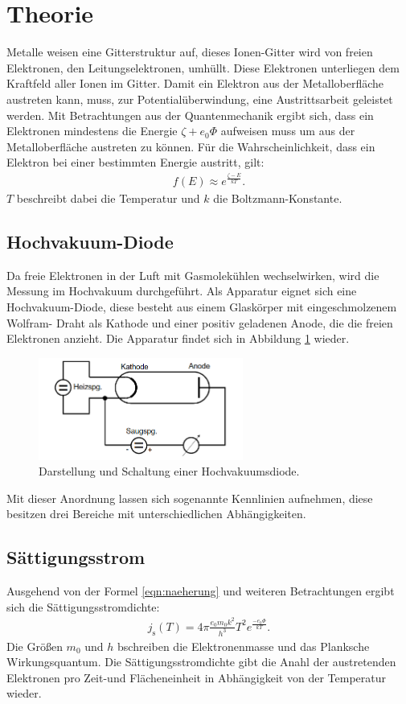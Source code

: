 \section{Theorie}
\label{sec:Theorie}
Metalle weisen eine Gitterstruktur auf, dieses Ionen-Gitter wird von freien Elektronen, den Leitungselektronen,
umhüllt. Diese Elektronen unterliegen dem Kraftfeld aller Ionen im Gitter.
Damit ein Elektron aus der Metalloberfläche austreten kann, muss, zur Potentialüberwindung, eine
Austrittsarbeit geleistet werden. Mit Betrachtungen aus der Quantenmechanik ergibt sich, dass
ein Elektronen mindestens die Energie $\zeta+e_\mathrm{0}\Phi$ aufweisen muss um aus der Metalloberfläche
austreten zu können. Für die Wahrscheinlichkeit, dass ein Elektron bei einer bestimmten Energie austritt, gilt:
\begin{align}
f(E)\approx e^{\frac{\zeta-E}{kT}}\label{eqn:naeherung}.
\end{align}
$T$ beschreibt dabei die Temperatur und $k$ die Boltzmann-Konstante.

\subsection{Hochvakuum-Diode}
Da freie Elektronen in der Luft mit Gasmolekühlen wechselwirken, wird die Messung im Hochvakuum durchgeführt.
Als Apparatur eignet sich eine Hochvakuum-Diode, diese besteht aus einem Glaskörper mit eingeschmolzenem Wolfram-
Draht als Kathode und einer positiv geladenen Anode, die die freien Elektronen anzieht.
Die Apparatur findet sich in Abbildung \ref{fig:aufbau} wieder.
\begin{figure}
 \centering
 \includegraphics[width=0.6\textwidth]{aufbau.png}
 \caption{Darstellung und Schaltung einer Hochvakuumsdiode.\cite{sample}}
 \label{fig:aufbau}
 \end{figure}
 Mit dieser Anordnung lassen sich sogenannte Kennlinien aufnehmen, diese besitzen drei Bereiche mit unterschiedlichen Abhängigkeiten.


\subsection{Sättigungsstrom}
Ausgehend von der Formel \eqref{eqn:naeherung} und weiteren Betrachtungen ergibt sich
die Sättigungsstromdichte:
\begin{align}
j_\mathrm{s}(T)=4\pi\frac{e_\mathrm{0} m_\mathrm{0} k^2}{h^3} T^2 e^{\frac{-e_\mathrm{0}\Phi}{kT}} \label{eqn:st}.
\end{align}
Die Größen $m_\mathrm{0}$ und $h$ bschreiben die Elektronenmasse und das Planksche Wirkungsquantum.
Die Sättigungsstromdichte gibt die Anahl der austretenden Elektronen pro Zeit-und Flächeneinheit
in Abhängigkeit von der Temperatur wieder.

